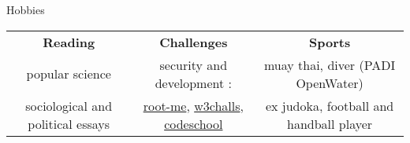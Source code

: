 \begin{rSection}{Hobbies}

  \begin{center}
      \begin{tabular}
          {c | c | c}
          \textbf{Reading} & \textbf{Challenges} & \textbf{Sports} \\
          popular science & security and development : &  muay thai, diver (PADI OpenWater) \\
          sociological and political essays  & \href{http://www.root-me.org/Pamplemouss_?inc=score&lang=fr}{root-me}, \href{https://w3challs.com/profile/Pamplemouss_}{w3challs}, \href{https://www.codeschool.com/users/Pamplemouss_}{codeschool} & ex judoka, football and handball player \\
      \end{tabular}
  \end{center}

\end{rSection}
